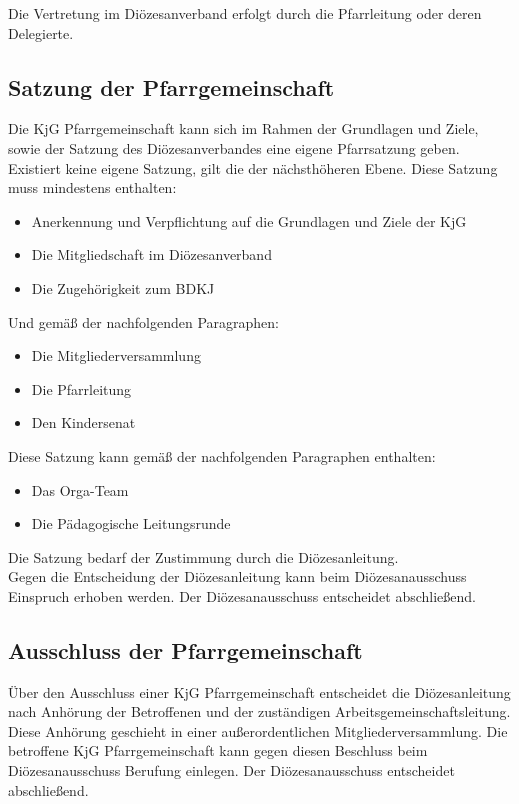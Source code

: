 \documentclass[12pt]{report}
\begin{document}
\begin{justify}
Die Vertretung im Diözesanverband erfolgt durch die Pfarrleitung oder deren Delegierte.
\subsection{Satzung der Pfarrgemeinschaft}
Die KjG Pfarrgemeinschaft kann sich im Rahmen der Grundlagen und Ziele, sowie der Satzung
des Diözesanverbandes eine eigene Pfarrsatzung geben. Existiert keine eigene Satzung, gilt die
der nächsthöheren Ebene. Diese Satzung muss mindestens enthalten:
\begin{itemize}
  \item Anerkennung und Verpflichtung auf die Grundlagen und Ziele der KjG
  \item Die Mitgliedschaft im Diözesanverband
  \item Die Zugehörigkeit zum BDKJ
\end{itemize}

Und gemäß der nachfolgenden Paragraphen:
\begin{itemize}
  \item Die Mitgliederversammlung
  \item Die Pfarrleitung
  \item Den Kindersenat
\end{itemize}

Diese Satzung kann gemäß der nachfolgenden Paragraphen enthalten:
\begin{itemize}
  \item Das Orga-Team
  \item Die Pädagogische Leitungsrunde
\end{itemize}

Die Satzung bedarf der Zustimmung durch die Diözesanleitung.\\

Gegen die Entscheidung der Diözesanleitung kann beim Diözesanausschuss Einspruch erhoben
werden. Der Diözesanausschuss entscheidet abschließend.
\subsection{Ausschluss der Pfarrgemeinschaft}
Über den Ausschluss einer KjG Pfarrgemeinschaft entscheidet die Diözesanleitung nach Anhörung
der Betroffenen und der zuständigen Arbeitsgemeinschaftsleitung.
Diese Anhörung geschieht in einer außerordentlichen Mitgliederversammlung. Die betroffene KjG Pfarrgemeinschaft
kann gegen diesen Beschluss beim Diözesanausschuss Berufung einlegen. 
Der Diözesanausschuss entscheidet abschließend.


\end{justify}
\end{document}
